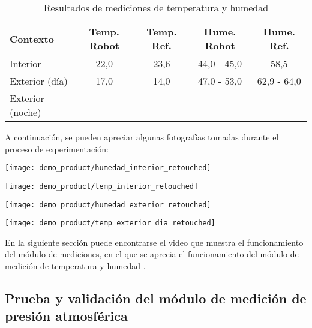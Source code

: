 \begin{table}[h]
\centering
\caption[Resultados de mediciones de temperatura y humedad]{Resultados de mediciones de temperatura y humedad}
\begin{tabular}{l c c c c}
\toprule
\textbf{Contexto} & \textbf{Temp. Robot} & \textbf{Temp. Ref.} & \textbf{Hume. Robot}  & \textbf{Hume. Ref.}\\
\midrule
Interior & 22,0 & 23,6 & 44,0 - 45,0 & 58,5 \\
Exterior (día) & 17,0  & 14,0 & 47,0 - 53,0 & 62,9 - 64,0 \\
Exterior (noche) & - & - & - & - \\
\bottomrule
\hline
\end{tabular}
\end{table}

A continuación, se pueden apreciar algunas fotografías tomadas durante el proceso de experimentación:

\begin{center}
\texttt{[image: demo\_product/humedad\_interior\_retouched]}
  \label{fig:humedad_interior}
\end{center}

\begin{center}
\texttt{[image: demo\_product/temp\_interior\_retouched]}
  \label{fig:humedad_interior}
\end{center}


\begin{center}
\texttt{[image: demo\_product/humedad\_exterior\_retouched]}
  \label{fig:humedad_interior}
\end{center}

\begin{center}
\texttt{[image: demo\_product/temp\_exterior\_dia\_retouched]}
  \label{fig:humedad_interior}
\end{center}

En la siguiente sección puede encontrarse el video que muestra el funcionamiento del módulo de mediciones, en el que se aprecia el funcionamiento del módulo de medición de temperatura y humedad \cite{Demo_Mediciones}.

\subsection{Prueba y validación del módulo de medición de presión atmosférica}

